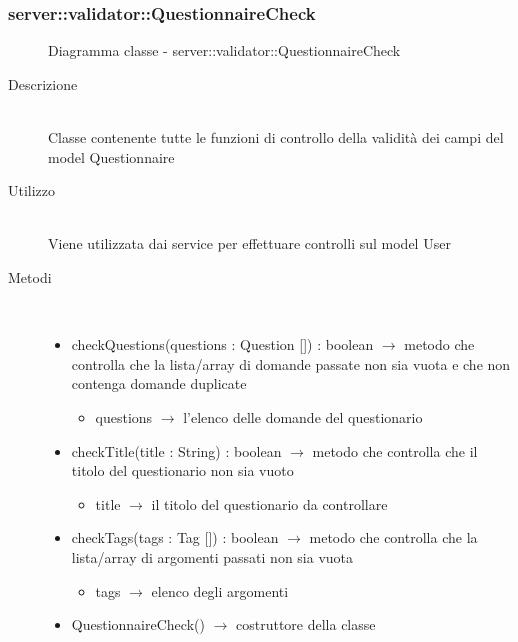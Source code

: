 \vspace{0.5cm}
\hypertarget{server::validator::QuestionnaireCheck}{}
\subsubsection[QuestionnaireCheck]{server::validator::QuestionnaireCheck}
\begin{figure}[H]
	\centering
	\caption{Diagramma classe - server::validator::QuestionnaireCheck}
\end{figure}\begin{description}
\item[Descrizione] \hfill \\
Classe contenente tutte le funzioni di controllo della validità dei campi del model Questionnaire
\item[Utilizzo] \hfill \\
Viene utilizzata dai service per effettuare controlli sul model User
\item[Metodi] \hfill \\
\vspace{-7mm}
\begin{itemize}
	\item checkQuestions(questions : Question []) : boolean $\rightarrow$ metodo che controlla che la lista/array di domande passate non sia vuota e che non contenga domande duplicate\begin{itemize}
		\item questions $\rightarrow$ l'elenco delle domande del questionario
	\end{itemize}
	
	\item checkTitle(title : String) : boolean $\rightarrow$ metodo che controlla che il titolo del questionario non sia vuoto\begin{itemize}
		\item title $\rightarrow$ il titolo del questionario da controllare
	\end{itemize}
	
	\item checkTags(tags : Tag []) : boolean $\rightarrow$ metodo che controlla che la lista/array di argomenti passati non sia vuota\begin{itemize}
		\item tags $\rightarrow$ elenco degli argomenti	
	\end{itemize}
	
	\item QuestionnaireCheck() $\rightarrow$ costruttore della classe
\end{itemize}

\end{description}

